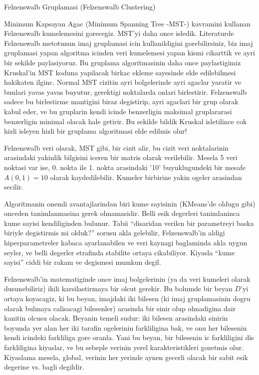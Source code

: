 \documentclass[12pt,fleqn]{article}\usepackage{../common}
\begin{document}
Felzenswalb Gruplamasi (Felzenswalb Clustering)

Minimum Kapsayan Agac (Minimum Spanning Tree -MST-) kavramini kullanan
Felzenswalb kumelemesini gorecegiz. MST'yi daha once isledik. Literaturde
Felzenswalb metotunun imaj gruplamasi icin kullanildigini gorebilirsiniz,
biz imaj gruplamasi yapan algoritma icinden veri kumelemesi yapan kismi
cikarttik ve ayri bir sekilde paylasiyoruz. Bu gruplama algoritmasinin daha
once paylastigimiz Kruskal'in MST koduna yapilacak birkac ekleme sayesinde
elde edilebilmesi hakikaten ilginc. Normal MST cizitin ayri bolgelerinde
ayri agaclar yaratir ve bunlari yavas yavas buyutur, gerektigi noktalarda
onlari birlestirir. Felzenswalb sadece bu birlestirme mantigini biraz
degistirip, ayri agaclari bir grup olarak kabul eder, ve bu gruplarin kendi
icinde benzerligin maksimal gruplararasi benzerligin minimal olacak hale
getirir. Bu sekilde bildik Kruskal isletilince cok hizli isleyen hizli bir
gruplama algoritmasi elde edilmis olur!

Felzenswalb veri olarak, MST gibi, bir cizit alir, bu cizit veri
noktalarinin arasindaki yakinlik bilgisini iceren bir matris olarak
verilebilir. Mesela 5 veri noktasi var ise, 0. nokta ile 1. nokta
arasindaki '10' buyuklugundeki bir mesafe $A(0,1) = 10$ olarak
kaydedilebilir. Kumeler birbirine yakin ogeler arasindan secilir.

Algoritmanin onemli avantajlarindan biri kume sayisinin (KMeans'de oldugu
gibi) onceden tanimlanmasina gerek olmamasidir. Belli esik degerleri
tanimlaninca kume sayisi kendiliginden bulunur. Tabii ``disaridan verilen
bir parametreyi baska biriyle degistirmis mi olduk?'' sorusu akla
gelebilir, Felzenswalb'in aldigi hiperparametreler kabaca ayarlanabilen ve
veri kaynagi baglaminda akla uygun seyler, ve belli degerler etrafinda
stabilite ortaya cikabiliyor. Kiyasla ``kume sayisi'' ciddi bir rakam ve
degismesi mumkun degil. 

Felzenswalb'in matematiginde once imaj bolgelerinin (ya da veri kumeleri
olarak dusunebiliriz) ikili karsilastirmaya bir olcut gerekir. Bu bolumde
bir beyan $D$'yi ortaya koyacagiz, ki bu beyan, imajdaki iki bilesen (ki
imaj gruplamasinin dogru olarak bulmaya calisacagi bilesenler) arasinda bir
sinir olup olmadigina dair kanitin olcusu olacak. Beyanin temeli sudur: iki
bilesen arasindaki sinirin boyunda yer alan her iki tarafin ogelerinin
farkliligina bak, ve onu her bilesenin kendi icindeki farkliliga gore
oranla. Yani bu beyan, bir bilesenin ic farkliligini dis farkliligina
kiyaslar, ve bu sebeple verinin yerel karakteristikleri gozetmis
olur. Kiyaslama mesela, global, verinin her yerinde aynen gecerli olacak
bir sabit esik degerine vs. bagli degildir.
\end{document}
